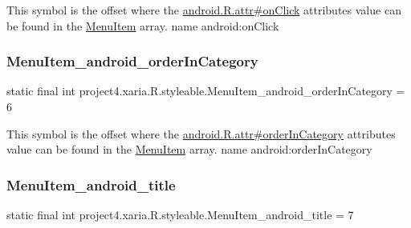 This symbol is the offset where the \hyperlink{}{android.\+R.\+attr\#on\+Click} attribute\textquotesingle{}s value can be found in the \hyperlink{classproject4_1_1xaria_1_1R_1_1styleable_a8a573827fcaba6497e560662224b5530}{Menu\+Item} array.  name android\+:on\+Click \mbox{\label{classproject4_1_1xaria_1_1R_1_1styleable_ae2a0816c4c9b67480600cac4a4fc9282}} 
\subsubsection{\texorpdfstring{Menu\+Item\+\_\+android\+\_\+order\+In\+Category}{MenuItem\_android\_orderInCategory}}
{\footnotesize\ttfamily static final int project4.\+xaria.\+R.\+styleable.\+Menu\+Item\+\_\+android\+\_\+order\+In\+Category = 6\hspace{0.3cm}{\ttfamily [static]}}

This symbol is the offset where the \hyperlink{}{android.\+R.\+attr\#order\+In\+Category} attribute\textquotesingle{}s value can be found in the \hyperlink{classproject4_1_1xaria_1_1R_1_1styleable_a8a573827fcaba6497e560662224b5530}{Menu\+Item} array.  name android\+:order\+In\+Category \mbox{\label{classproject4_1_1xaria_1_1R_1_1styleable_a386f2f1153e5a68c43202e15a0d95317}} 
\subsubsection{\texorpdfstring{Menu\+Item\+\_\+android\+\_\+title}{MenuItem\_android\_title}}
{\footnotesize\ttfamily static final int project4.\+xaria.\+R.\+styleable.\+Menu\+Item\+\_\+android\+\_\+title = 7\hspace{0.3cm}{\ttfamily [static]}}

